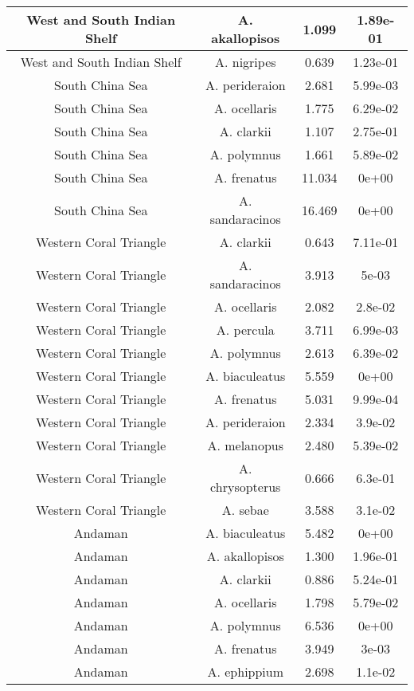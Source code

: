 \begin{table}[!h]
\begin{tabular}[t]{c|c|c|c}
\hline
West and South Indian Shelf & A. akallopisos & 1.099 & 1.89e-01\\
\hline
West and South Indian Shelf & A. nigripes & 0.639 & 1.23e-01\\
\hline
South China Sea & A. perideraion & 2.681 & 5.99e-03\\
\hline
South China Sea & A. ocellaris & 1.775 & 6.29e-02\\
\hline
South China Sea & A. clarkii & 1.107 & 2.75e-01\\
\hline
South China Sea & A. polymnus & 1.661 & 5.89e-02\\
\hline
South China Sea & A. frenatus & 11.034 & 0e+00\\
\hline
South China Sea & A. sandaracinos & 16.469 & 0e+00\\
\hline
Western Coral Triangle & A. clarkii & 0.643 & 7.11e-01\\
\hline
Western Coral Triangle & A. sandaracinos & 3.913 & 5e-03\\
\hline
Western Coral Triangle & A. ocellaris & 2.082 & 2.8e-02\\
\hline
Western Coral Triangle & A. percula & 3.711 & 6.99e-03\\
\hline
Western Coral Triangle & A. polymnus & 2.613 & 6.39e-02\\
\hline
Western Coral Triangle & A. biaculeatus & 5.559 & 0e+00\\
\hline
Western Coral Triangle & A. frenatus & 5.031 & 9.99e-04\\
\hline
Western Coral Triangle & A. perideraion & 2.334 & 3.9e-02\\
\hline
Western Coral Triangle & A. melanopus & 2.480 & 5.39e-02\\
\hline
Western Coral Triangle & A. chrysopterus & 0.666 & 6.3e-01\\
\hline
Western Coral Triangle & A. sebae & 3.588 & 3.1e-02\\
\hline
Andaman & A. biaculeatus & 5.482 & 0e+00\\
\hline
Andaman & A. akallopisos & 1.300 & 1.96e-01\\
\hline
Andaman & A. clarkii & 0.886 & 5.24e-01\\
\hline
Andaman & A. ocellaris & 1.798 & 5.79e-02\\
\hline
Andaman & A. polymnus & 6.536 & 0e+00\\
\hline
Andaman & A. frenatus & 3.949 & 3e-03\\
\hline
Andaman & A. ephippium & 2.698 & 1.1e-02\\
\hline

\end{tabular}
\end{table}
